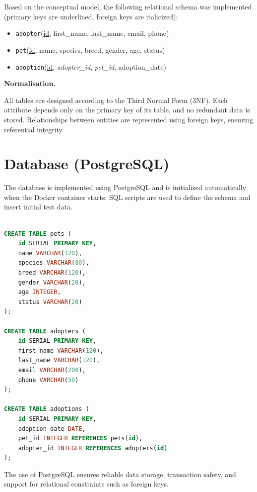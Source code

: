 \documentclass[11pt,a4paper]{article}
\begin{document}
Based on the conceptual model, the following relational schema was implemented
(primary keys are underlined, foreign keys are italicized):

\begin{itemize}
\item \texttt{adopter}(\underline{id}, first\_name, last\_name, email, phone)
\item \texttt{pet}(\underline{id}, name, species, breed, gender, age, status)
\item \texttt{adoption}(\underline{id}, \emph{adopter\_id}, \emph{pet\_id}, adoption\_date)
\end{itemize}

\textbf{Normalisation.}

All tables are designed according to the Third Normal Form (3NF). Each attribute
depends only on the primary key of its table, and no redundant data is stored.
Relationships between entities are represented using foreign keys, ensuring
referential integrity.

\section{Database (PostgreSQL)}


The database is implemented using PostgreSQL and is initialized automatically
when the Docker container starts. SQL scripts are used to define the schema and
insert initial test data.

\begin{lstlisting}[language=SQL, caption={schema.sql (excerpt)}]

CREATE TABLE pets (
    id SERIAL PRIMARY KEY,
    name VARCHAR(120),
    species VARCHAR(80),
    breed VARCHAR(120),
    gender VARCHAR(20),
    age INTEGER,
    status VARCHAR(20)
);

CREATE TABLE adopters (
    id SERIAL PRIMARY KEY,
    first_name VARCHAR(120),
    last_name VARCHAR(120),
    email VARCHAR(200),
    phone VARCHAR(50)
);

CREATE TABLE adoptions (
    id SERIAL PRIMARY KEY,
    adoption_date DATE,
    pet_id INTEGER REFERENCES pets(id),
    adopter_id INTEGER REFERENCES adopters(id)
);

\end{lstlisting}

The use of PostgreSQL ensures reliable data storage, transaction safety, and
support for relational constraints such as foreign keys.
\end{document}
